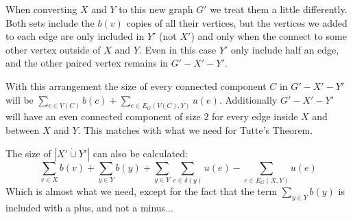 \documentclass{article}
\begin{document}
  When converting $X$ and $Y$ to this new graph $G'$ we treat them a little differently.
  Both sets include the $b(v)$ copies of all their vertices,
  but the vertices we added to each edge are only included in $Y'$ (not $X'$)
  and only when the connect to some other vertex outside of $X$ and $Y$.
  Even in this case $Y'$ only include half an edge, and the other paired vertex remains in $G' - X' - Y'$.

  With this arrangement the size of every connected component $C$ in $G' - X' - Y'$ will be
  $\sum_{c\in V(C)}b(c) + \sum_{e\in E_G(V(C),Y)}u(e)$.
  Additionally $G' - X' - Y'$ will have an even connected component of size $2$ for every edge inside $X$ and between $X$ and $Y$.
  This matches with what we need for Tutte's Theorem.

  The size of $|X' \dot\cup Y'|$ can also be calculated:
  \[ \sum_{v\in X}b(v) +
    \sum_{y\in Y}b(y) +
    \sum_{y\in Y}\sum_{e\in\delta(y)}u(e) -
    \sum_{e\in E_{G}(X,Y)}u(e) \]
  Which is almost what we need, except for the fact that the term $\sum_{y\in Y}b(y)$ is included with a plus, and not a minus...
\end{document}
